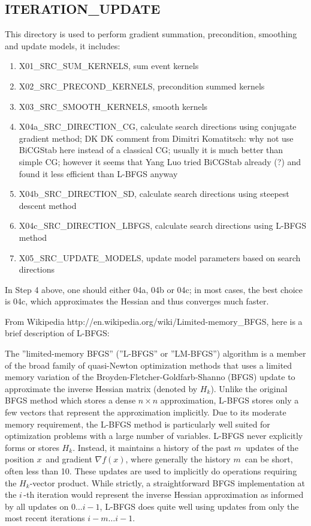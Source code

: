 \documentclass[11pt]{article}
\begin{document}
\subsection{ITERATION\_UPDATE}
This directory is used to perform gradient summation, precondition, smoothing and update models, it includes:
\begin{enumerate}
\item X01\_SRC\_SUM\_KERNELS, sum event kernels
\item X02\_SRC\_PRECOND\_KERNELS, precondition summed kernels
\item X03\_SRC\_SMOOTH\_KERNELS, smooth kernels
\item X04a\_SRC\_DIRECTION\_CG, calculate search directions using conjugate gradient method; DK DK comment from Dimitri Komatitsch: why not use BiCGStab here
instead of a classical CG; usually it is much better than simple CG; however it seems that Yang Luo tried BiCGStab already (?) and found it less efficient than L-BFGS anyway
\item X04b\_SRC\_DIRECTION\_SD, calculate search directions using steepest descent method
\item X04c\_SRC\_DIRECTION\_LBFGS, calculate search directions using L-BFGS method
\item X05\_SRC\_UPDATE\_MODELS, update model parameters based on search directions
\end{enumerate}

In Step 4 above, one should either 04a, 04b or 04c; in most cases, the best choice is 04c, which approximates the Hessian and thus
converges much faster.

From Wikipedia http://en.wikipedia.org/wiki/Limited-memory\_BFGS, here is a brief description of L-BFGS:

The ''limited-memory BFGS'' (''L-BFGS'' or ''LM-BFGS'') algorithm is a member of the broad family of quasi-Newton optimization methods that uses a limited memory variation of the Broyden-Fletcher-Goldfarb-Shanno (BFGS) update to approximate the inverse Hessian matrix (denoted by $H_k$). Unlike the original BFGS method which stores a dense $ n \times n $ approximation, L-BFGS stores only a few vectors that represent the approximation implicitly. Due to its moderate memory requirement, the L-BFGS method is particularly well suited for optimization problems with a large number of variables.  L-BFGS never explicitly forms or stores $H_k$.  Instead, it maintains a history of the past $m\,\!$ updates of the position  $x\,\!$ and gradient  $\nabla f(x)$, where generally the history  $m\,\!$ can be short, often less than 10.  These updates are used to implicitly do operations requiring the $H_k$-vector product.  While strictly, a straightforward BFGS implementation at the  $i\,\!$-th iteration would represent the inverse Hessian approximation as informed by all updates on  $0 \ldots i-1$, L-BFGS does quite well using updates from only the most recent iterations  $i-m \ldots i-1$.
\end{document}

